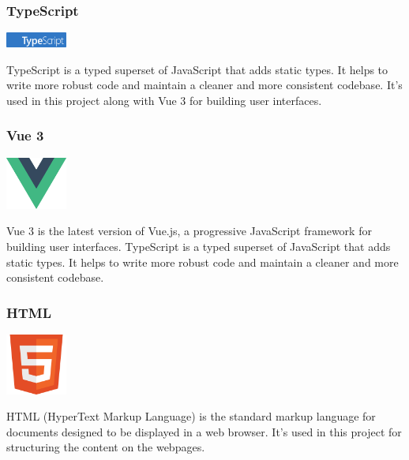 \subsubsection*{TypeScript}

\begin{center}
\includegraphics[width=0.15\textwidth]{Images/logos/ts-lettermark-blue.png}
\label{fig:typescript}
\end{center}
TypeScript is a typed superset of JavaScript that adds static types. It helps to write more robust code and maintain a cleaner and more consistent codebase. It’s used in this project along with Vue 3 for building user interfaces.

\subsubsection*{Vue 3}

\begin{center}
\includegraphics[width=0.15\textwidth]{Images/logos/vue.png}
\label{fig:vue3}
\end{center}
Vue 3 is the latest version of Vue.js, a progressive JavaScript framework for building user interfaces. TypeScript is a typed superset of JavaScript that adds static types. It helps to write more robust code and maintain a cleaner and more consistent codebase.

\clearpage

\subsubsection*{HTML}

\begin{center}
\includegraphics[width=0.15\textwidth]{Images/logos/html.png}
\label{fig:html}
\end{center}
HTML (HyperText Markup Language) is the standard markup language for documents designed to be displayed in a web browser. It’s used in this project for structuring the content on the webpages.

